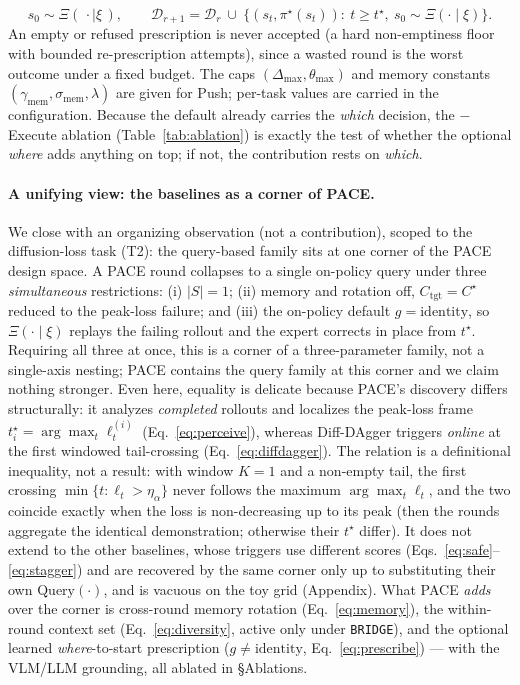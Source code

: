 \documentclass[letterpaper]{article} %
\begin{document}
\begin{equation}
s_0\sim\Xi(\,\cdot\mid\xi\,),
\qquad
\mathcal{D}_{r+1}=\mathcal{D}_r\ \cup\ \big\{(s_t,\pi^\star(s_t)):\ t\ge t^\star,\ s_0\sim\Xi(\cdot\mid\xi)\big\}.
\label{eq:prescribe-demo}
\end{equation}
An empty or refused prescription is never accepted (a hard non-emptiness floor with
bounded re-prescription attempts), since a wasted round is the worst outcome under a
fixed budget. The caps $(\Delta_{\max},\theta_{\max})$ and memory constants
$(\gamma_{\mathrm{mem}},\sigma_{\mathrm{mem}},\lambda)$ are given for Push; per-task
values are carried in the configuration. Because the default already carries the
\emph{which} decision, the $-$Execute ablation (Table~\ref{tab:ablation}) is exactly
the test of whether the optional \emph{where} adds anything on top; if not, the
contribution rests on \emph{which}.

\paragraph{A unifying view: the baselines as a corner of PACE.}
We close with an organizing observation (not a contribution), scoped to the
diffusion-loss task (T2): the query-based family sits at one corner of the PACE
design space. A PACE round collapses to a single on-policy query under three
\emph{simultaneous} restrictions: (i) $|S|=1$; (ii) memory and rotation off,
$C_{\mathrm{tgt}}=C^\star$ reduced to the peak-loss failure; and (iii) the on-policy
default $g=\mathrm{identity}$, so $\Xi(\cdot\mid\xi)$ replays the failing rollout and
the expert corrects in place from $t^\star$. Requiring all three at once, this is a
corner of a three-parameter family, not a single-axis nesting; PACE contains the
query family at this corner and we claim nothing stronger. Even here, equality is
delicate because PACE's discovery differs structurally: it analyzes \emph{completed}
rollouts and localizes the peak-loss frame $t^\star_i=\arg\max_t\ell^{(i)}_t$
(Eq.~\ref{eq:perceive}), whereas Diff-DAgger triggers \emph{online} at the first
windowed tail-crossing (Eq.~\ref{eq:diffdagger}). The relation is a definitional
inequality, not a result: with window $K{=}1$ and a non-empty tail, the first
crossing $\min\{t:\ell_t>\eta_\alpha\}$ never follows the maximum $\arg\max_t\ell_t$,
and the two coincide exactly when the loss is non-decreasing up to its peak (then the
rounds aggregate the identical demonstration; otherwise their $t^\star$ differ). It
does not extend to the other baselines, whose triggers use different scores
(Eqs.~\ref{eq:safe}--\ref{eq:stagger}) and are recovered by the same corner only up
to substituting their own $\mathrm{Query}(\cdot)$, and is vacuous on the toy grid
(Appendix). What PACE \emph{adds} over the corner is cross-round memory
rotation (Eq.~\ref{eq:memory}), the within-round context set (Eq.~\ref{eq:diversity},
active only under \texttt{BRIDGE}), and the optional learned \emph{where}-to-start
prescription ($g\neq\mathrm{identity}$, Eq.~\ref{eq:prescribe}) --- with the VLM/LLM
grounding, all ablated in \S Ablations.
\end{document}

